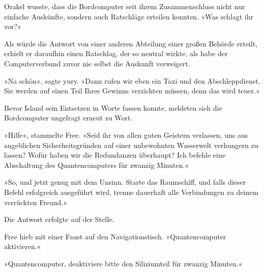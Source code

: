 Orakel wusste, dass die Bordcomputer seit ihrem Zusammenschluss nicht nur einfache Auskünfte, sondern auch Ratschläge erteilen konnten. »Was schlagt ihr vor?«

Als würde die Antwort von einer anderen Abteilung einer großen Behörde erteilt, erhielt er daraufhin einen Ratschlag, der so neutral wirkte, als habe der Computerverbund zuvor nie selbst die Auskunft verweigert.


»Na schön«, sagte yury. »Dann rufen wir eben ein Taxi und den Abschleppdienst. Sie werden auf einen Teil Ihres Gewinns verzichten müssen, denn das wird teuer.«

Bevor Island sein Entsetzen in Worte fassen konnte, meldeten sich die Bordcomputer ungefragt erneut zu Wort. 

»Hilfe«, stammelte Free. »Seid ihr von allen guten Geistern verlassen, uns aus angeblichen Sicherheitsgründen auf einer unbewohnten Wasserwelt verhungern zu lassen? Wofür haben wir die Redundanzen überhaupt? Ich befehle eine Abschaltung des Quantencomputers für zwanzig Minuten.«


»So, und jetzt genug mit dem Unsinn. Starte das Raumschiff, und falls dieser Befehl erfolgreich ausgeführt wird, trenne dauerhaft alle Verbindungen zu deinem verrückten Freund.«

Die Antwort erfolgte auf der Stelle. 

Free hieb mit einer Faust auf den Navigationstisch. »Quantencomputer aktivieren.«


»Quantencomputer, deaktiviere bitte den Siliziumteil für zwanzig Minuten.«

